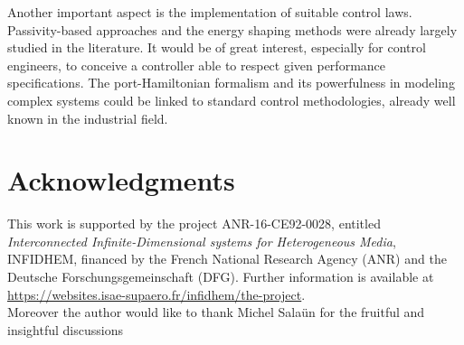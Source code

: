 \documentclass[preprint,12pt]{elsarticle}
\begin{document}
Another important aspect is the implementation of suitable control laws. Passivity-based approaches and the energy shaping methods were already largely studied in the literature. It would be of great interest, especially for control engineers, to conceive a controller able to respect given performance specifications. The port-Hamiltonian formalism and its powerfulness in modeling complex systems could be linked to standard control methodologies, already well known in the industrial field.   

\section*{Acknowledgments}
This work is  supported by the project ANR-16-CE92-0028,
entitled {\em Interconnected Infinite-Dimensional systems for Heterogeneous
Media}, INFIDHEM, financed by the French National
Research Agency (ANR) and the Deutsche Forschungsgemeinschaft (DFG).
Further information is available at {\url{https://websites.isae-supaero.fr/infidhem/the-project}}.  \\
Moreover the author would like to thank Michel Sala\"un for the fruitful and insightful discussions
   

 

	
	
\end{document}
